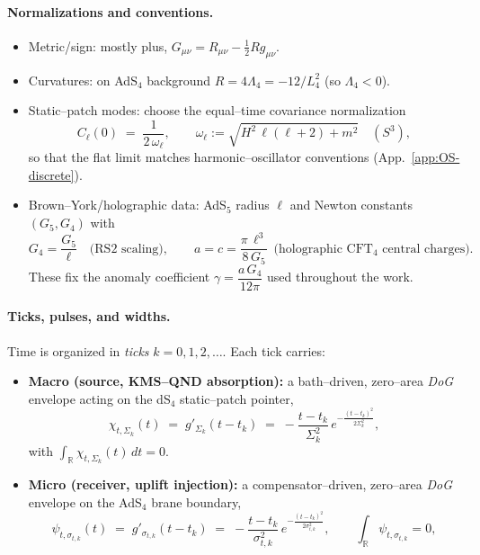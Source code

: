 \documentclass[10pt]{article}
\theoremstyle{definition}
\theoremstyle{plain}
\begin{document}
\paragraph{Normalizations and conventions.}\label{par:uom-main-008}
\begin{itemize}[leftmargin=1.5em, itemsep=2pt]
\item Metric/sign: mostly plus, $G_{\mu\nu}=R_{\mu\nu}-\tfrac12 R g_{\mu\nu}$.
\item Curvatures: on AdS$_4$ background $R=4\Lambda_4=-12/L_4^2$ (so $\Lambda_4<0$).
\item Static–patch modes: choose the equal–time covariance normalization
\[
C_\ell(0)\;=\;\frac{1}{2\,\omega_\ell},\qquad \omega_\ell:=\sqrt{H^2\,\ell(\ell+2)+m^2}\quad (S^3),
\]
so that the flat limit matches harmonic–oscillator conventions (App.~\ref{app:OS-discrete}).
\item Brown–York/holographic data: AdS$_5$ radius $\ell$ and Newton constants $(G_5,G_4)$ with
\[
G_4=\frac{G_5}{\ell}\quad\text{(RS2 scaling)},\qquad
a=c=\frac{\pi\,\ell^3}{8\,G_5}\ \ \text{(holographic CFT$_4$ central charges)}.
\]
These fix the anomaly coefficient $\gamma=\dfrac{a\,G_4}{12\pi}$ used throughout the work.
\end{itemize}



\paragraph{Ticks, pulses, and widths.}\label{par:uom-main-009}
Time is organized in \emph{ticks} $k=0,1,2,\dots$. Each tick carries:
\begin{itemize}
  \item \textbf{Macro (source, KMS–QND absorption):} a bath–driven, zero–area \emph{DoG} envelope acting on the dS$_4$ static–patch pointer,
  \[
  \chi_{t,\Sigma_k}(t)\;=\;g'_{\Sigma_k}(t-t_k)\;=\;-\frac{t-t_k}{\Sigma_k^{2}}\,e^{-\frac{(t-t_k)^2}{2\Sigma_k^2}},
  \]
  with $\int_{\mathbb R}\chi_{t,\Sigma_k}(t)\,dt=0$.
  \item \textbf{Micro (receiver, uplift injection):} a compensator–driven, zero–area \emph{DoG} envelope on the AdS$_4$ brane boundary,
  \[
  \psi_{t,\sigma_{t,k}}(t)\;=\;g'_{\sigma_{t,k}}(t-t_k)\;=\;-\frac{t-t_k}{\sigma_{t,k}^{2}}\,e^{-\frac{(t-t_k)^2}{2\sigma_{t,k}^2}},\qquad \int_{\mathbb R}\psi_{t,\sigma_{t,k}}=0,
  \]
\end{itemize}
\end{document}
